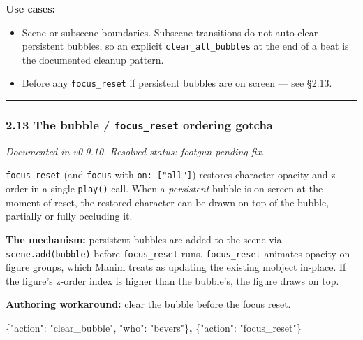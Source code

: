 \documentclass[
  11pt,
]{book}
\newenvironment{Shaded}{}{}
\newcommand{\DataTypeTok}[1]{\textcolor[rgb]{0.56,0.13,0.00}{#1}}
\newcommand{\ErrorTok}[1]{\textcolor[rgb]{1.00,0.00,0.00}{\textbf{#1}}}
\newcommand{\FunctionTok}[1]{\textcolor[rgb]{0.02,0.16,0.49}{#1}}
\newcommand{\StringTok}[1]{\textcolor[rgb]{0.25,0.44,0.63}{#1}}
\providecommand{\tightlist}{%
  \setlength{\itemsep}{0pt}\setlength{\parskip}{0pt}}
\begin{document}
\textbf{Use cases:}

\begin{itemize}
\tightlist
\item
  Scene or subscene boundaries. Subscene transitions do not auto-clear
  persistent bubbles, so an explicit \texttt{clear\_all\_bubbles} at the
  end of a beat is the documented cleanup pattern.
\item
  Before any \texttt{focus\_reset} if persistent bubbles are on screen
  --- see §2.13.
\end{itemize}

\begin{center}\rule{0.5\linewidth}{0.5pt}\end{center}

\subsubsection{\texorpdfstring{2.13 The bubble / \texttt{focus\_reset}
ordering
gotcha}{2.13 The bubble / focus\_reset ordering gotcha}}\label{the-bubble-focus_reset-ordering-gotcha}

\emph{Documented in v0.9.10. Resolved-status: footgun pending fix.}

\texttt{focus\_reset} (and \texttt{focus} with
\texttt{on:\ {[}"all"{]}}) restores character opacity and z-order in a
single \texttt{play()} call. When a \emph{persistent} bubble is on
screen at the moment of reset, the restored character can be drawn on
top of the bubble, partially or fully occluding it.

\textbf{The mechanism:} persistent bubbles are added to the scene via
\texttt{scene.add(bubble)} before \texttt{focus\_reset} runs.
\texttt{focus\_reset} animates opacity on figure groups, which Manim
treats as updating the existing mobject in-place. If the figure's
z-order index is higher than the bubble's, the figure draws on top.

\textbf{Authoring workaround:} clear the bubble before the focus reset.

\begin{Shaded}
\begin{Highlighting}[]
\FunctionTok{\{}\DataTypeTok{"action"}\FunctionTok{:} \StringTok{"clear\_bubble"}\FunctionTok{,} \DataTypeTok{"who"}\FunctionTok{:} \StringTok{"bevers"}\FunctionTok{\}}\ErrorTok{,}
\FunctionTok{\{}\DataTypeTok{"action"}\FunctionTok{:} \StringTok{"focus\_reset"}\FunctionTok{\}}
\end{Highlighting}
\end{Shaded}
\end{document}
